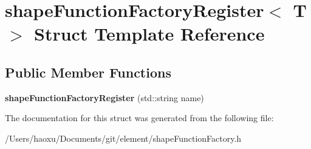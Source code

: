 \hypertarget{structshape_function_factory_register}{}\section{shape\+Function\+Factory\+Register$<$ T $>$ Struct Template Reference}
\label{structshape_function_factory_register}
\subsection*{Public Member Functions}
\begin{DoxyCompactItemize}
\item 
\mbox{\label{structshape_function_factory_register_a39effd54e9b362fd10daae4bf72aab1c}} 
{\bfseries shape\+Function\+Factory\+Register} (std\+::string name)
\end{DoxyCompactItemize}


The documentation for this struct was generated from the following file\+:\begin{DoxyCompactItemize}
\item 
/\+Users/haoxu/\+Documents/git/element/shape\+Function\+Factory.\+h\end{DoxyCompactItemize}
